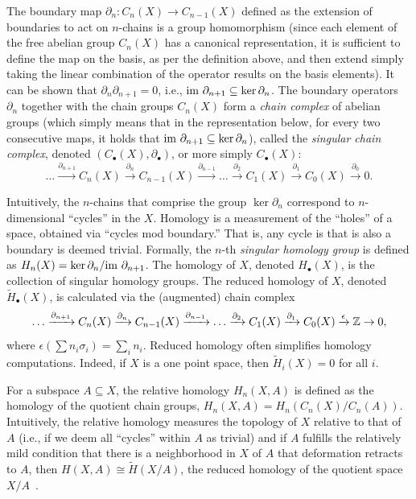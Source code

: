 \documentclass[11pt]{article}
\begin{document}
The boundary map $\partial_n: C_n(X)\to C_{n-1}(X)$
defined as the extension of boundaries to act on $n$-chains
is a group homomorphism
(since each element of the free abelian group $C_n(X)$ has a canonical representation, it is sufficient to define the map on the basis, as per the definition above, and then extend simply taking the linear combination of the operator results on the basis elements).
It can be shown that $\partial_n\partial_{n+1}=0$, i.e., $\text{im } \partial_{n+1}\subseteq \ker \partial_n$.
The boundary operators $\partial_n$ together with the chain groups $C_n(X)$ form a {\em chain complex} of abelian groups (which simply means that in the representation below, for every two consecutive maps, it holds that $\text{im } \partial_{n+1}\subseteq \ker \partial_n$), called the \emph{singular chain complex}, denoted $(C_\bullet(X),\partial_\bullet)$, or more simply $C_\bullet(X)$:
\[
\ldots \xrightarrow{\partial_{n+1}} C_n(X) 
\xrightarrow{\partial_n} C_{n-1}(X) 
\xrightarrow{\partial_{n-1}} \ldots
\xrightarrow{\partial_2} C_1(X)
\xrightarrow{\partial_1} C_0(X) \xrightarrow{\partial_0} 0.
\]

Intuitively, the $n$-chains that comprise the group $\ker\partial_n$ correspond to $n$-dimensional ``cycles'' in the $X$. Homology is a measurement of the ``holes'' of a space, obtained via ``cycles mod boundary.'' That is, any cycle is that is also a boundary is deemed trivial.  
Formally, the $n$-th \emph{singular homology group} is defined as $H_n(X) = \ker\partial_n / \text{im } \partial_{n+1}$.  The homology of $X$, denoted $H_\bullet(X)$, is the collection of singular homology groups. The reduced homology of $X$, denoted $\tilde{H}_\bullet(X)$, is calculated via the (augmented) chain complex
\[
\ldots \xrightarrow{\partial_{n+1}} C_n(X) 
\xrightarrow{\partial_n} C_{n-1}(X) 
\xrightarrow{\partial_{n-1}} \ldots
\xrightarrow{\partial_2} C_1(X)
\xrightarrow{\partial_1} C_0(X)
\xrightarrow{\epsilon}  {\mathbb{Z}} \to 0,
\]
where $\epsilon(\sum n_i \sigma_i) = \sum_i n_i$.  Reduced homology often simplifies homology computations.  Indeed, if $X$ is a one point space, then $\tilde{H}_i(X) = 0$ for all $i$.

For a subspace $A\subseteq X$, the relative homology $H_n(X,A)$ is defined as the homology of the quotient chain groups, $H_n(X,A) = H_n(C_n(X)/C_n(A))$.  Intuitively, the relative homology measures the topology of $X$ relative to that of $A$ (i.e., if we deem all ``cycles'' within $A$ as trivial) and if $A$ fulfills the relatively mild condition that there is a neighborhood in $X$ of $A$ that deformation retracts to $A$, then $H(X,A)\cong \tilde{H}(X/A)$, the reduced homology of the quotient space $X/A$~\citep{hatcher}.
\end{document}
